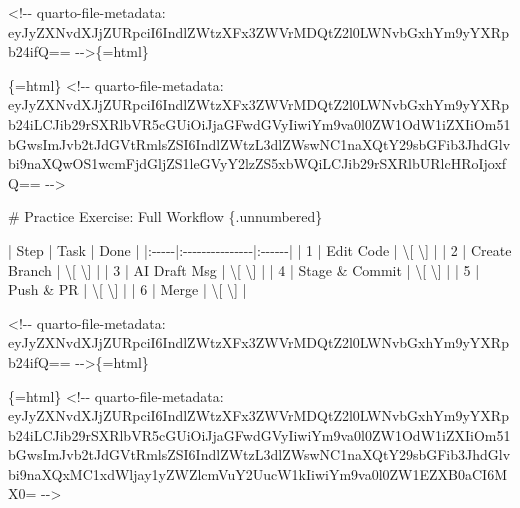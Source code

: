 \documentclass[
  letterpaper,
  DIV=11,
  numbers=noendperiod,
  oneside]{scrreprt}
\newenvironment{Shaded}{\begin{snugshade}}{\end{snugshade}}
\newcommand{\FunctionTok}[1]{\textcolor[rgb]{0.28,0.35,0.67}{#1}}
\newcommand{\InformationTok}[1]{\textcolor[rgb]{0.37,0.37,0.37}{#1}}
\newcommand{\NormalTok}[1]{\textcolor[rgb]{0.00,0.23,0.31}{#1}}
\newcommand{\PreprocessorTok}[1]{\textcolor[rgb]{0.68,0.00,0.00}{#1}}
\newcommand{\SpecialCharTok}[1]{\textcolor[rgb]{0.37,0.37,0.37}{#1}}
\begin{document}
\begin{Shaded}
\begin{Highlighting}[numbers=left,,]
\InformationTok{\textasciigrave{}\textless{}!{-}{-} quarto{-}file{-}metadata: eyJyZXNvdXJjZURpciI6IndlZWtzXFx3ZWVrMDQtZ2l0LWNvbGxhYm9yYXRpb24ifQ== {-}{-}\textgreater{}\textasciigrave{}}\NormalTok{\{=html\}}

\InformationTok{\textasciigrave{}\textasciigrave{}\textasciigrave{}\{=html\}}
\InformationTok{\textless{}!{-}{-} quarto{-}file{-}metadata: eyJyZXNvdXJjZURpciI6IndlZWtzXFx3ZWVrMDQtZ2l0LWNvbGxhYm9yYXRpb24iLCJib29rSXRlbVR5cGUiOiJjaGFwdGVyIiwiYm9va0l0ZW1OdW1iZXIiOm51bGwsImJvb2tJdGVtRmlsZSI6IndlZWtzL3dlZWswNC1naXQtY29sbGFib3JhdGlvbi9naXQwOS1wcmFjdGljZS1leGVyY2lzZS5xbWQiLCJib29rSXRlbURlcHRoIjoxfQ== {-}{-}\textgreater{}}
\InformationTok{\textasciigrave{}\textasciigrave{}\textasciigrave{}}

\FunctionTok{\# Practice Exercise: Full Workflow \{.unnumbered\}}


\PreprocessorTok{|}\NormalTok{ Step }\PreprocessorTok{|}\NormalTok{ Task           }\PreprocessorTok{|}\NormalTok{ Done  }\PreprocessorTok{|}
\PreprocessorTok{|:{-}{-}{-}{-}{-}|:{-}{-}{-}{-}{-}{-}{-}{-}{-}{-}{-}{-}{-}{-}{-}|:{-}{-}{-}{-}{-}{-}|}
\PreprocessorTok{|}\NormalTok{ 1    }\PreprocessorTok{|}\NormalTok{ Edit Code      }\PreprocessorTok{|} \SpecialCharTok{\textbackslash{}[} \SpecialCharTok{\textbackslash{}]} \PreprocessorTok{|}
\PreprocessorTok{|}\NormalTok{ 2    }\PreprocessorTok{|}\NormalTok{ Create Branch  }\PreprocessorTok{|} \SpecialCharTok{\textbackslash{}[} \SpecialCharTok{\textbackslash{}]} \PreprocessorTok{|}
\PreprocessorTok{|}\NormalTok{ 3    }\PreprocessorTok{|}\NormalTok{ AI Draft Msg   }\PreprocessorTok{|} \SpecialCharTok{\textbackslash{}[} \SpecialCharTok{\textbackslash{}]} \PreprocessorTok{|}
\PreprocessorTok{|}\NormalTok{ 4    }\PreprocessorTok{|}\NormalTok{ Stage \& Commit }\PreprocessorTok{|} \SpecialCharTok{\textbackslash{}[} \SpecialCharTok{\textbackslash{}]} \PreprocessorTok{|}
\PreprocessorTok{|}\NormalTok{ 5    }\PreprocessorTok{|}\NormalTok{ Push \& PR      }\PreprocessorTok{|} \SpecialCharTok{\textbackslash{}[} \SpecialCharTok{\textbackslash{}]} \PreprocessorTok{|}
\PreprocessorTok{|}\NormalTok{ 6    }\PreprocessorTok{|}\NormalTok{ Merge          }\PreprocessorTok{|} \SpecialCharTok{\textbackslash{}[} \SpecialCharTok{\textbackslash{}]} \PreprocessorTok{|}


\InformationTok{\textasciigrave{}\textless{}!{-}{-} quarto{-}file{-}metadata: eyJyZXNvdXJjZURpciI6IndlZWtzXFx3ZWVrMDQtZ2l0LWNvbGxhYm9yYXRpb24ifQ== {-}{-}\textgreater{}\textasciigrave{}}\NormalTok{\{=html\}}

\InformationTok{\textasciigrave{}\textasciigrave{}\textasciigrave{}\{=html\}}
\InformationTok{\textless{}!{-}{-} quarto{-}file{-}metadata: eyJyZXNvdXJjZURpciI6IndlZWtzXFx3ZWVrMDQtZ2l0LWNvbGxhYm9yYXRpb24iLCJib29rSXRlbVR5cGUiOiJjaGFwdGVyIiwiYm9va0l0ZW1OdW1iZXIiOm51bGwsImJvb2tJdGVtRmlsZSI6IndlZWtzL3dlZWswNC1naXQtY29sbGFib3JhdGlvbi9naXQxMC1xdWljay1yZWZlcmVuY2UucW1kIiwiYm9va0l0ZW1EZXB0aCI6MX0= {-}{-}\textgreater{}}
\InformationTok{\textasciigrave{}\textasciigrave{}\textasciigrave{}}


\end{Highlighting}
\end{Shaded}
\end{document}

